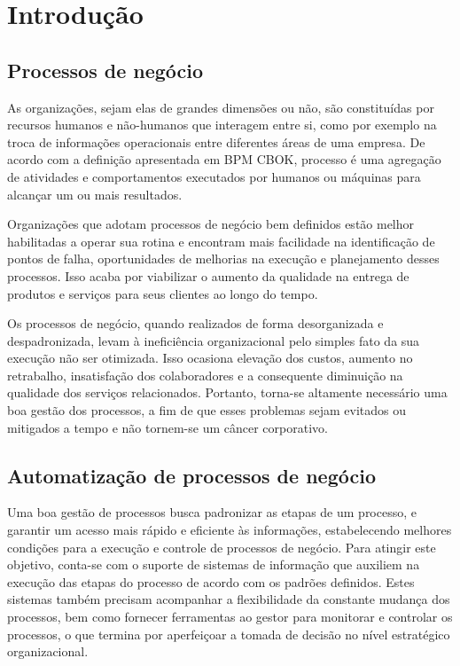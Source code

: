 \chapter{Introdução}\label{chp:introducao}

\section{Processos de negócio}\label{sec:introducao-processos_negocio}

As organizações, sejam elas de grandes dimensões ou não, são constituídas por recursos humanos e não-humanos que interagem entre si, como por exemplo na troca de informações operacionais entre diferentes áreas de uma empresa. De acordo com a definição apresentada em BPM CBOK\cite{bpm_cbok}, processo é uma agregação de atividades e comportamentos executados por humanos ou máquinas para alcançar um ou mais resultados.

Organizações que adotam processos de negócio bem definidos estão melhor habilitadas a operar sua rotina e encontram mais facilidade na identificação de pontos de falha, oportunidades de melhorias na execução e planejamento desses processos. Isso acaba por viabilizar o aumento da qualidade na entrega de produtos e serviços para seus clientes ao longo do tempo.

Os processos de negócio, quando realizados de forma desorganizada e despadronizada, levam à ineficiência organizacional pelo simples fato da sua execução não ser otimizada. Isso ocasiona elevação dos custos, aumento no retrabalho, insatisfação dos colaboradores e a consequente diminuição na qualidade dos serviços relacionados. Portanto, torna-se altamente necessário uma boa gestão dos processos, a fim de que esses problemas sejam evitados ou mitigados a tempo e não tornem-se um câncer corporativo. 

\section{Automatização de processos de negócio}\label{sec:introducao-automatizacao}

Uma boa gestão de processos busca padronizar as etapas de um processo, e garantir um acesso mais rápido e eficiente às informações, estabelecendo melhores condições para a execução e controle de processos de negócio. Para atingir este objetivo, conta-se com o suporte de sistemas de informação que auxiliem na execução das etapas do processo de acordo com os padrões definidos. Estes sistemas também precisam acompanhar a flexibilidade da constante mudança dos processos, bem como fornecer ferramentas ao gestor para monitorar e controlar os processos, o que termina por aperfeiçoar a tomada de decisão no nível estratégico organizacional.


